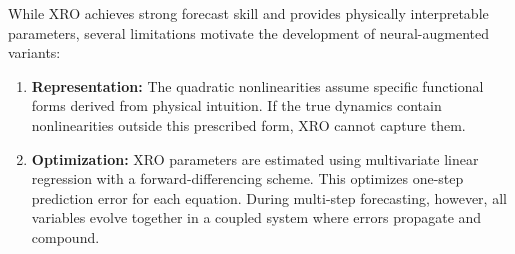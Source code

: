 While XRO achieves strong forecast skill and provides physically interpretable parameters, several limitations motivate the development of neural-augmented variants: 

\begin{enumerate}
    \item \textbf{Representation:} The quadratic nonlinearities assume specific functional forms derived from physical intuition. If the true dynamics contain nonlinearities outside this prescribed form, XRO cannot capture them.
    \item \textbf{Optimization:} XRO parameters are estimated using multivariate linear regression with a forward-differencing scheme. This optimizes one-step prediction error for each equation. During multi-step forecasting, however, all variables evolve together in a coupled system where errors propagate and compound.
\end{enumerate}
